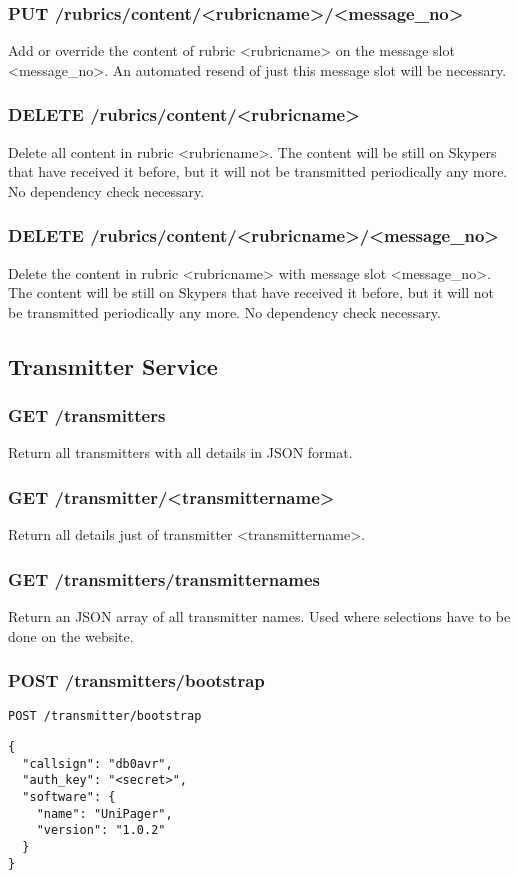 \subsubsection{PUT /rubrics/content/<rubricname>/<message\_no>}
Add or override the content of rubric <rubricname> on the message slot <message\_no>. An automated resend of just this message slot will be necessary.

\subsubsection{DELETE /rubrics/content/<rubricname>}
Delete all content in rubric <rubricname>. The content will be still on Skypers that have received it before, but it will not be transmitted periodically any more. No dependency check necessary.

\subsubsection{DELETE /rubrics/content/<rubricname>/<message\_no>}
Delete the content in rubric <rubricname> with message slot <message\_no>. The content will be still on Skypers that have received it before, but it will not be transmitted periodically any more. No dependency check necessary.

\subsection{Transmitter Service}

\subsubsection{GET /transmitters}
Return all transmitters with all details in JSON format.

\subsubsection{GET /transmitter/<transmittername>}
Return all details just of transmitter <transmittername>.

\subsubsection{GET /transmitters/transmitternames}
Return an JSON array of all transmitter names. Used where selections have to be done on the website.

\subsubsection{POST /transmitters/bootstrap}
\label{protcoldef:transmitters:bootstrap}
\texttt{POST /transmitter/bootstrap}
\begin{lstlisting}
{
  "callsign": "db0avr",
  "auth_key": "<secret>",
  "software": {
    "name": "UniPager",
    "version": "1.0.2"
  }
}
\end{lstlisting}

